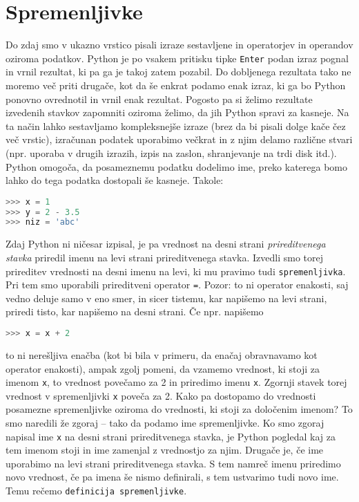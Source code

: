 \section{Spremenljivke}
Do zdaj smo v ukazno vrstico pisali izraze sestavljene in operatorjev in operandov oziroma podatkov. Python je po vsakem pritisku tipke \texttt{Enter} podan izraz pognal in vrnil rezultat, ki pa ga je takoj zatem pozabil. Do dobljenega rezultata tako ne moremo več priti drugače, kot da še enkrat podamo enak izraz, ki ga bo Python ponovno ovrednotil in vrnil enak rezultat. Pogosto pa si želimo rezultate izvedenih stavkov zapomniti oziroma želimo, da jih Python spravi za kasneje. Na ta način lahko sestavljamo kompleksnejše izraze (brez da bi pisali dolge kače čez več vrstic), izračunan podatek uporabimo večkrat in z njim delamo različne stvari (npr. uporaba v drugih izrazih, izpis na zaslon, shranjevanje na trdi disk itd.). Python omogoča, da posameznemu podatku dodelimo ime, preko katerega bomo lahko do tega podatka dostopali še kasneje. Takole:
\begin{lstlisting}[language=Python]
>>> x = 1
>>> y = 2 - 3.5
>>> niz = 'abc'
\end{lstlisting}
Zdaj Python ni ničesar izpisal, je pa vrednost na desni strani \emph{prireditvenega stavka} priredil imenu na levi strani prireditvenega stavka. Izvedli smo torej prireditev vrednosti na desni imenu na levi, ki mu pravimo tudi \texttt{spremenljivka}. Pri tem smo uporabili prireditveni operator \texttt{=}. Pozor: to ni operator enakosti, saj vedno deluje samo v eno smer, in sicer tistemu, kar napišemo na levi strani, priredi tisto, kar napišemo na desni strani. Če npr. napišemo
\begin{lstlisting}[language=Python]
>>> x = x + 2
\end{lstlisting}
to ni nerešljiva enačba (kot bi bila v primeru, da enačaj obravnavamo kot operator enakosti), ampak zgolj pomeni, da vzamemo vrednost, ki stoji za imenom \texttt{x}, to vrednost povečamo za 2 in priredimo imenu \texttt{x}. Zgornji stavek torej vrednost v spremenljivki \texttt{x} poveča za 2. Kako pa dostopamo do vrednosti posamezne spremenljivke oziroma do vrednosti, ki stoji za določenim imenom? To smo naredili že zgoraj -- tako da podamo ime spremenljivke. Ko smo zgoraj napisal ime \texttt{x} na desni strani prireditvenega stavka, je Python pogledal kaj za tem imenom stoji in ime zamenjal z vrednostjo za njim. Drugače je, če ime uporabimo na levi strani prireditvenega stavka. S tem namreč imenu priredimo novo vrednost, če pa imena še nismo definirali, s tem ustvarimo tudi novo ime. Temu rečemo \texttt{definicija spremenljivke}.

